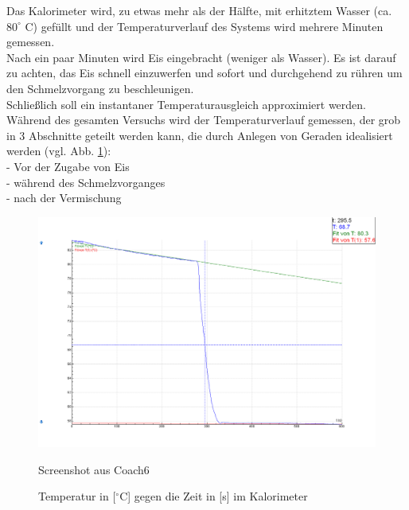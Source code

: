 \documentclass[12pt,a4paper]{article}
\begin{document}
\begin{multicols}{2}
Das Kalorimeter wird, zu etwas mehr als der Hälfte, mit erhitztem Wasser (ca. $80^{\circ}$ C) gefüllt und der Temperaturverlauf des Systems wird mehrere Minuten gemessen.\\
Nach ein paar Minuten wird Eis eingebracht (weniger als Wasser). Es ist darauf zu achten, das Eis schnell einzuwerfen und sofort und durchgehend zu rühren um den Schmelzvorgang zu beschleunigen.\\
Schließlich soll ein instantaner Temperaturausgleich approximiert werden.\\
Während des gesamten Versuchs wird der Temperaturverlauf gemessen, der grob in 3 Abschnitte geteilt werden kann, die durch Anlegen von Geraden idealisiert werden (vgl. Abb. \ref{fig:Tempverlauf-Eis}):\\
- Vor der Zugabe von Eis\\
- während des Schmelzvorganges\\
- nach der Vermischung


\end{multicols}

\begin{figure}[H]
	\centering
	\includegraphics[scale=0.35]{./figure/PW4_graph.PNG}
	\caption{Temperatur in [$^\circ$C] gegen die Zeit in [s] im Kalorimeter\ }
	{\centering Screenshot aus Coach6}
	\label{fig:Tempverlauf-Eis}
\end{figure}
\noindent
\end{document}
